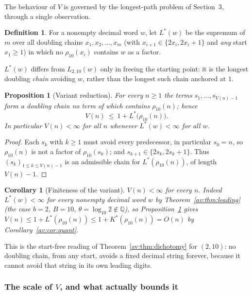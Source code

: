 \documentclass[a4paper]{article}
\theoremstyle{plain}
\newtheorem{proposition}{Proposition}[subsection]
\newtheorem{corollary}{Corollary}[subsection]
\theoremstyle{definition}
\newtheorem{definition}{Definition}[subsection]
\theoremstyle{remark}
\newcommand{\QQ}{\mathbb{Q}}
\newcommand{\Lbb}[1][b,B]{L_{#1}}
\begin{document}
The behaviour of $V$ is governed by the longest-path problem of Section~3, through a single observation.

\begin{definition}
For a nonempty decimal word $w$, let $L^{*}(w)$ be the supremum of $m$ over all doubling chains $x_1,x_2,\dots,x_m$ (with $x_{i+1}\in\{2x_i,2x_i+1\}$ and \emph{any} start $x_1\ge1$) in which no $\rho_{10}(x_i)$ contains $w$ as a factor.
\end{definition}

$L^{*}(w)$ differs from $\Lbb[2,10](w)$ only in freeing the starting point: it is the longest doubling \emph{chain} avoiding $w$, rather than the longest such chain anchored at $1$.

\begin{proposition}[Variant reduction]\label{av:prop:variant}
For every $n\ge1$ the terms $s_1,\dots,s_{V(n)-1}$ form a doubling chain no term of which contains $\rho_{10}(n)$; hence
\[
V(n)\ \le\ 1+L^{*}\!\bigl(\rho_{10}(n)\bigr).
\]
In particular $V(n)<\infty$ for all $n$ whenever $L^{*}(w)<\infty$ for all $w$.
\end{proposition}

\begin{proof}
Each $s_k$ with $k\ge1$ must avoid every predecessor, in particular $s_0=n$, so $\rho_{10}(n)$ is not a factor of $\rho_{10}(s_k)$; and $s_{k+1}\in\{2s_k,2s_k+1\}$. Thus $(s_k)_{1\le k\le V(n)-1}$ is an admissible chain for $L^{*}(\rho_{10}(n))$, of length $V(n)-1$.
\end{proof}

\begin{corollary}[Finiteness of the variant]\label{av:cor:variant}
$V(n)<\infty$ for every $n$. Indeed $L^{*}(w)<\infty$ for every nonempty decimal word $w$ by Theorem~\ref{av:thm:leading} (the case $b=2$, $B=10$, $\theta=\log_{10}2\notin\QQ$), so Proposition~\ref{av:prop:variant} gives $V(n)\le 1+L^{*}(\rho_{10}(n))\le 1+K^{*}(\rho_{10}(n))=O(n)$ by Corollary~\ref{av:cor:quant}.
\end{corollary}

This is the start-free reading of Theorem~\ref{av:thm:dichotomy} for $(2,10)$: no doubling chain, from any start, avoids a fixed decimal string forever, because it cannot avoid that string in its own leading digits.

\subsubsection{The scale of \texorpdfstring{$V$}{V}, and what actually bounds it}
\end{document}
